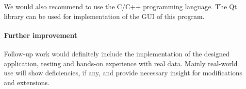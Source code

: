 We would also recommend to use the C/C++ programming language. The Qt library can be used for implementation of the GUI of this program.

\paragraph*{Further improvement}
Follow-up work would definitely include the implementation of the designed application, testing and hands-on experience with real data.
Mainly real-world use will show deficiencies, if any, and provide necessary insight for modifications and extensions.


%
%
%
%
%
%
%
